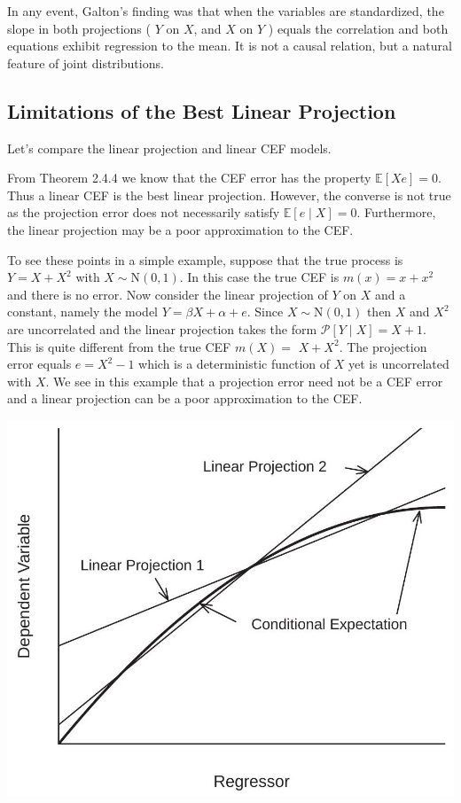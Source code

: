 \documentclass[10pt]{article}
\begin{document}
In any event, Galton's finding was that when the variables are standardized, the slope in both projections ( $Y$ on $X$, and $X$ on $Y$ ) equals the correlation and both equations exhibit regression to the mean. It is not a causal relation, but a natural feature of joint distributions.

\subsection{Limitations of the Best Linear Projection}
Let's compare the linear projection and linear CEF models.

From Theorem 2.4.4 we know that the CEF error has the property $\mathbb{E}[X e]=0$. Thus a linear CEF is the best linear projection. However, the converse is not true as the projection error does not necessarily satisfy $\mathbb{E}[e \mid X]=0$. Furthermore, the linear projection may be a poor approximation to the CEF.

To see these points in a simple example, suppose that the true process is $Y=X+X^{2}$ with $X \sim \mathrm{N}(0,1)$. In this case the true CEF is $m(x)=x+x^{2}$ and there is no error. Now consider the linear projection of $Y$ on $X$ and a constant, namely the model $Y=\beta X+\alpha+e$. Since $X \sim \mathrm{N}(0,1)$ then $X$ and $X^{2}$ are uncorrelated and the linear projection takes the form $\mathscr{P}[Y \mid X]=X+1$. This is quite different from the true CEF $m(X)=$ $X+X^{2}$. The projection error equals $e=X^{2}-1$ which is a deterministic function of $X$ yet is uncorrelated with $X$. We see in this example that a projection error need not be a CEF error and a linear projection can be a poor approximation to the CEF.

\includegraphics[max width=\textwidth]{2022_09_17_efa0deee3441d06e0b66g-36}
\end{document}
